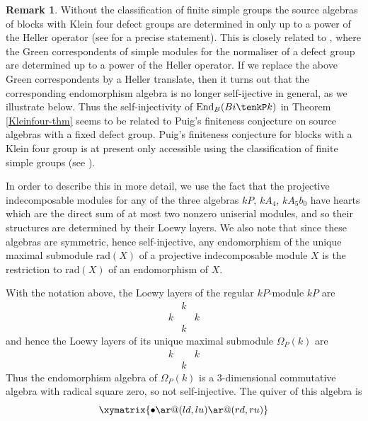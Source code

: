 \documentclass{amsart}
\theoremstyle{plain}\newtheorem{Theorem}{Theorem}[section]
\theoremstyle{plain}\newtheorem{Conjecture}[Theorem]{Conjecture}
\theoremstyle{plain}\newtheorem{Corollary}[Theorem]{Corollary}
\theoremstyle{plain}\newtheorem{Lemma}[Theorem]{Lemma}
\theoremstyle{plain}\newtheorem{Proposition}[Theorem]{Proposition}
\theoremstyle{definition}\newtheorem{Definition}[Theorem]{Definition}
\theoremstyle{definition}\newtheorem{Example}[Theorem]{Example}
\theoremstyle{definition}\newtheorem{Examples}[Theorem]{Examples}
\theoremstyle{definition}\newtheorem{Exercise}[Theorem]{Exercise}
\theoremstyle{definition}\newtheorem{Notation}[Theorem]{Notation}
\theoremstyle{definition}\newtheorem{Remark}[Theorem]{Remark}
\theoremstyle{definition}\newtheorem{Remarks}[Theorem]{Remarks}
\theoremstyle{plain}\newtheorem{Statement}[Theorem]{}
\def\End{\mathrm{End}}
\def\rad{\mathrm{rad}}           \def\tenOP{\otimes_{\mathcal{O}P}}
\begin{document}
\begin{Remark} \label{Kleinfour-remark}
Without the classification of finite simple groups the source algebras of blocks 
with Klein four defect groups are determined in \cite{LiKleinfour} only up to
a power of the Heller operator (see \cite[Theorem 1.1]{LiKleinfour} for a precise
statement). This 
is closely related to \cite[Theorem 3]{Erdmann82}, where the Green correspondents
of simple modules for the normaliser of a defect group are determined up to 
a power of the Heller operator. If we replace the above Green correspondents
by a Heller translate, then it turns out that 
the corresponding endomorphism algebra is no
longer self-ijective in general, as we illustrate below. Thus the self-injectivity
of $\End_B(Bi\tenkP k)$ in Theorem \ref{Kleinfour-thm}  seems to be related
to Puig's finiteness conjecture on source algebras with a fixed  defect group.
Puig's finiteness conjecture for blocks with a Klein four group
 is at present only accessible using  the classification of finite simple groups
(see \cite{CEKL}). 

In order to describe this in more detail, we use 
the fact that the projective indecomposable modules for any of the
three algebras $kP$, $kA_4$, $kA_5b_0$ have hearts which are the direct
sum of at most two nonzero  uniserial modules, and so their structures are
determined by their Loewy layers. We also note that since these algebras 
are symmetric, hence self-injective, 
any endomorphism of the unique  maximal submodule $\rad(X)$  of a
projective indecomposable module $X$ is the restriction to $\rad(X)$ of 
an endomorphism of $X$. 

With the notation above, the Loewy layers of the regular $kP$-module $kP$ are 
$$\begin{matrix} & k & \\ k & & k \\ & k & \end{matrix}  $$
and hence the Loewy layers of its unique maximal submodule $\Omega_P(k)$
are
$$\begin{matrix}  k & & k \\ & k & \end{matrix}  $$
Thus the endomorphism algebra of $\Omega_P(k)$ is
a $3$-dimensional commutative algebra with radical square zero, so not
self-injective. The quiver of this algebra is
$$\xymatrix{\bullet \ar@(ld,lu) \ar@(rd,ru) }$$


\end{Remark}
\end{document}
